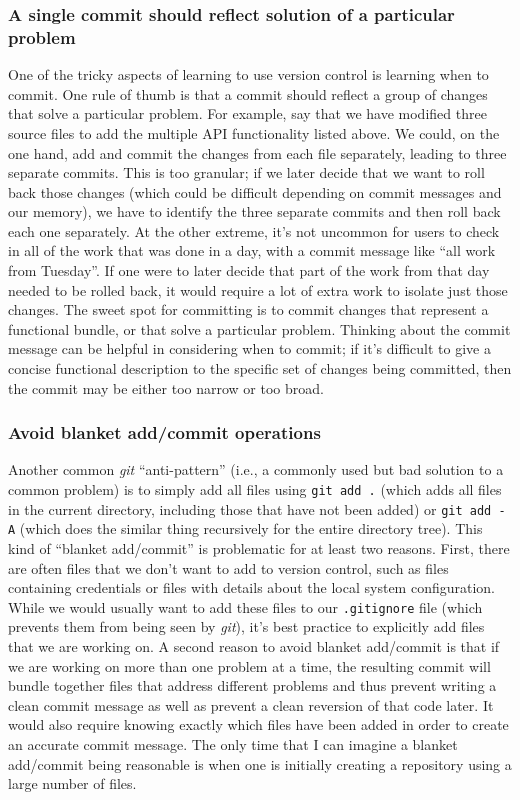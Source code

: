 \subsubsection{A single commit should reflect solution of a particular problem}

One of the tricky aspects of learning to use version control is learning when to commit.
One rule of thumb is that a commit should reflect a group of changes that solve a particular problem.
For example, say that we have modified three source files to add the multiple API functionality listed above.
We could, on the one hand, add and commit the changes from each file separately, leading to three separate commits.
This is too granular; if we later decide that we want to roll back those changes (which could be difficult depending on commit messages and our memory), we have to identify the three separate commits and then roll back each one separately.
At the other extreme, it's not uncommon for users to check in all of the work that was done in a day, with a commit message like ``all work from Tuesday''.
If one were to later decide that part of the work from that day needed to be rolled back, it would require a lot of extra work to isolate just those changes.
The sweet spot for committing is to commit changes that represent a functional bundle, or that solve a particular problem.
Thinking about the commit message can be helpful in considering when to commit; if it's difficult to give a concise functional description to the specific set of changes being committed, then the commit may be either too narrow or too broad.

\subsubsection{Avoid blanket add/commit operations}

Another common \textit{git} ``anti-pattern'' (i.e., a commonly used but bad solution to a common problem) is to simply add all files using \texttt{git add .} (which adds all files in the current directory, including those that have not been added) or \texttt{git add -A} (which does the similar thing recursively for the entire directory tree).
This kind of ``blanket add/commit'' is problematic for at least two reasons.
First, there are often files that we don't want to add to version control, such as files containing credentials or files with details about the local system configuration.
While we would usually want to add these files to our \texttt{.gitignore} file (which prevents them from being seen by \textit{git}), it's best practice to explicitly add files that we are working on.
A second reason to avoid blanket add/commit is that if we are working on more than one problem at a time, the resulting commit will bundle together files that address different problems and thus prevent writing a clean commit message as well as prevent a clean reversion of that code later.
It would also require knowing exactly which files have been added in order to create an accurate commit message.
The only time that I can imagine a blanket add/commit being reasonable is when one is initially creating a repository using a large number of files.

